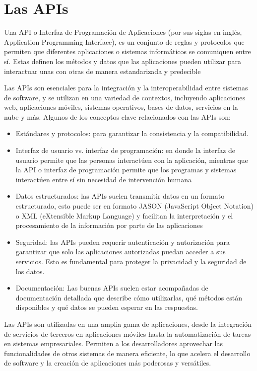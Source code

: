 \documentclass[../Main.tex]{subfiles}
\begin{document}
\section{Las APIs}
\noindent
Una API o Interfaz de Programación de Aplicaciones (por sus siglas en inglés, Application Programming Interface), es un conjunto de reglas y protocolos que permiten que diferentes aplicaciones o sistemas informáticos se comuniquen entre sí.
Estas definen los métodos y datos que las aplicaciones pueden utilizar para interactuar unas con otras de manera estandarizada y predecible

\smallskip
Las APIs son esenciales para la integración y la interoperabilidad entre sistemas de software, y se utilizan en una variedad de contextos, incluyendo aplicaciones web, aplicaciones móviles, sistemas operativos, bases de datos, servicios en la nube y más. Algunos de los conceptos clave relacionados con las APIs son:  

 \smallskip
\begin{itemize}
\item Estándares y protocolos: para garantizar la consistencia y la compatibilidad.
\item Interfaz de usuario vs. interfaz de programación: en donde la interfaz de usuario permite que las personas interactúen con la aplicación, mientras que la API o interfaz de programación permite que los programas y sistemas interactúen entre sí sin necesidad de intervención humana
\item Datos estructurados: las APIs suelen transmitir datos en un formato estructurado, esto puede ser en formato JASON (JavaScript Object Notation) o XML (eXtensible Markup Language) y facilitan la interpretación y el procesamiento de la información por parte de las aplicaciones
\item Seguridad: las APIs pueden requerir autenticación y autorización para garantizar que solo las aplicaciones autorizadas puedan acceder a sus servicios. Esto es fundamental para proteger la privacidad y la seguridad de los datos.
\item Documentación: Las buenas APIs suelen estar acompañadas de documentación detallada que describe cómo utilizarlas, qué métodos están disponibles y qué datos se pueden esperar en las respuestas.
\end{itemize}

Las APIs son utilizadas en una amplia gama de aplicaciones, desde la integración de servicios de terceros en aplicaciones móviles hasta la automatización de tareas en sistemas empresariales. Permiten a los desarrolladores aprovechar las funcionalidades de otros sistemas de manera eficiente, lo que acelera el desarrollo de software y la creación de aplicaciones más poderosas y versátiles. 
\end{document}

